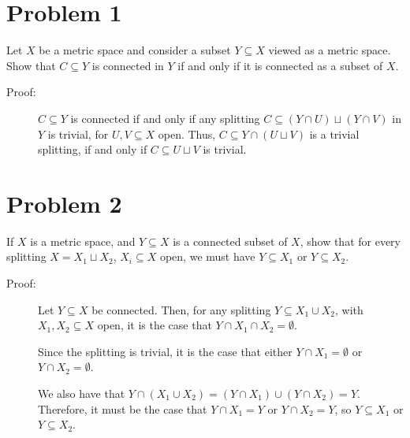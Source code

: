 \documentclass[8pt]{extarticle}
\title{}
\author{}
\date{}
\begin{document}
  \section{Problem 1}%
  Let $X$ be a metric space and consider a subset $Y\subseteq X$ viewed as a metric space. Show that $C\subseteq Y$ is connected in $Y$ if and only if it is connected as a subset of $X$.
  \begin{description}
    \item[Proof:] $C\subseteq Y$ is connected if and only if any splitting $C\subseteq (Y\cap U)\sqcup(Y\cap V)$ in $Y$ is trivial, for $U,V\subseteq X$ open. Thus, $C\subseteq Y\cap (U\sqcup V)$ is a trivial splitting, if and only if $C\subseteq U\sqcup V$ is trivial.
  \end{description}
  \section{Problem 2}%
  If $X$ is a metric space, and $Y\subseteq X$ is a connected subset of $X$, show that for every splitting $X = X_1\sqcup X_2$, $X_i\subseteq X$ open, we must have $Y\subseteq X_1$ or $Y\subseteq X_2$.
  \begin{description}
    \item[Proof:] Let $Y\subseteq X$ be connected. Then, for any splitting $Y\subseteq X_1\cup X_2$, with $X_1,X_2\subseteq X$ open, it is the case that $Y\cap X_1\cap X_2 = \emptyset$.

      Since the splitting is trivial, it is the case that either $Y\cap X_1 = \emptyset$ or $Y\cap X_2 = \emptyset$.

      We also have that $Y\cap (X_1 \cup X_2) = \left(Y\cap X_1\right) \cup \left(Y\cap X_2\right) = Y$. Therefore, it must be the case that $Y\cap X_1 = Y$ or $Y\cap X_2 = Y$, so $Y\subseteq X_1$ or $Y\subseteq X_2$.
  \end{description}
\end{document}
